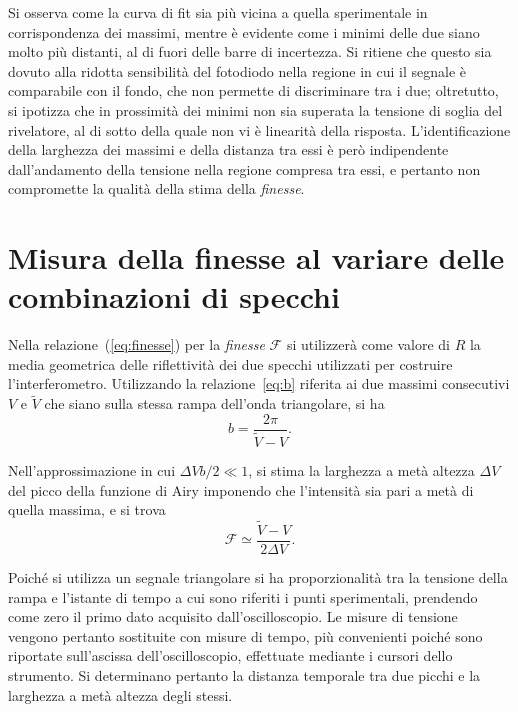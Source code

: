 \documentclass[10pt,oneside,a4paper]{article}
\begin{document}
\begin{multicols}{2}
Si osserva come la curva di fit sia più vicina a quella sperimentale in corrispondenza dei massimi, mentre è evidente come i minimi delle due siano molto più distanti, al di fuori delle barre di incertezza. Si ritiene che questo sia dovuto alla ridotta sensibilità del fotodiodo nella regione in cui il segnale è comparabile con il fondo, che non permette di discriminare tra i due; oltretutto, si ipotizza che in prossimità dei minimi non sia superata la tensione di soglia del rivelatore, al di sotto della quale non vi è linearità della risposta. L'identificazione della larghezza dei massimi e della distanza tra essi è però indipendente dall'andamento della tensione nella regione compresa tra essi, e pertanto non compromette la qualità della stima della \emph{finesse}.  


\section{Misura della finesse al variare delle combinazioni di specchi}\label{sec:finesse}
Nella relazione~(\ref{eq:finesse}) per la \emph{finesse} $\mathcal{F}$ si utilizzerà come valore di $R$ la media geometrica delle riflettività dei due specchi utilizzati per costruire l'interferometro. Utilizzando la relazione~\ref{eq:b} riferita ai due massimi consecutivi $V$ e $\tilde{V}$ che siano sulla stessa rampa dell'onda triangolare, si ha
\begin{equation}\label{eq:b}
	b=\frac{2\pi}{\tilde{V}-V}.
\end{equation}

Nell'approssimazione in cui ${\Delta V b/ 2 \ll 1}$, si stima la larghezza a metà altezza $\Delta V$ del picco della funzione di Airy imponendo che l'intensità sia pari a metà di quella massima, e si trova
\begin{equation}\label{eq:F_approx}
	\mathcal{F} \simeq \frac{\tilde{V} - V}{2 \Delta V}.
\end{equation}

Poiché si utilizza un segnale triangolare si ha proporzionalità tra la tensione della rampa e l'istante di tempo a cui sono riferiti i punti sperimentali, prendendo come zero il primo dato acquisito dall'oscilloscopio. Le misure di tensione vengono pertanto sostituite con misure di tempo, più convenienti poiché sono riportate sull'ascissa dell'oscilloscopio, effettuate mediante i cursori dello strumento. Si determinano pertanto la distanza temporale tra due picchi e la larghezza a metà altezza degli stessi.
 

\end{multicols}
\end{document}

